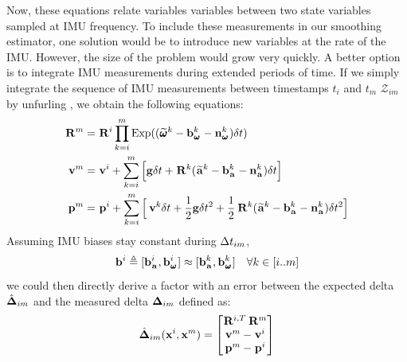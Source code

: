 Now, these equations relate variables variables between two state variables sampled at IMU frequency. To include these measurements in our smoothing estimator,
one solution would be to introduce new variables at the rate of the IMU. However, the size of the problem would grow very quickly. A better option
is to integrate IMU measurements during extended periods of time. If we simply integrate the sequence of IMU measurements between timestamps 
$t_i$ and $t_m$ $\mathcal{Z}_{im}$ by unfurling , we obtain the following equations:
%
\begin{equation}
    \begin{split}
    \prescript{}{}{{\bf R}}_{}^{m}  &= \prescript{}{}{{\bf R}}_{}^{i} \prod_{k=i}^{m} \operatorname*{Exp}((\prescript{}{}{\widetilde{\pmb{\omega}}}_{}^k - {\bf b}_{\prescript{}{}{\pmb{\omega}}_{}}^k - {\bf n}_{\prescript{}{}{\pmb{\omega}}_{}}^k)\delta t) \\
    \prescript{}{}{{\bf v}}_{}^{m}  &= \prescript{}{}{{\bf v}}_{}^{i} + \sum_{k=i}^{m} \Big[{\bf g} \delta t + \prescript{}{}{{\bf R}}_{}^{k}(\prescript{}{}{\widetilde{{\bf a}}}_{}^k - {\bf b}_{\prescript{}{}{{\bf a}}_{}}^k - {\bf n}_{\prescript{}{}{{\bf a}}_{}}^k)\delta t \Big]  \\
    \prescript{}{}{{\bf p}}_{}^{m} &= \prescript{}{}{{\bf p}}_{}^{i} + \sum_{k=i}^{m} \Big[\prescript{}{}{{\bf v}}_{}^{k}\delta t + \frac{1}{2}{\bf g} \delta t^2 
    + \frac{1}{2}\prescript{}{}{{\bf R}}_{}^{k}(\prescript{}{}{\widetilde{{\bf a}}}_{}^k - {\bf b}_{\prescript{}{}{{\bf a}}_{}}^k - {\bf n}_{\prescript{}{}{{\bf a}}_{}}^k)\delta t^2 \Big]
    \end{split}
    \label{eq:IMUIntij}
\end{equation}
%
Assuming IMU biases stay constant during $\Delta t_{im}$, 
\begin{equation*}
    {\bf b}^i \triangleq [{\bf b}_{\prescript{}{}{{\bf a}}_{}}^i, {\bf b}_{\prescript{}{}{\pmb{\omega}}_{}}^i] \approx [{\bf b}_{\prescript{}{}{{\bf a}}_{}}^k, {\bf b}_{\prescript{}{}{\pmb{\omega}}_{}}^k]  ~~~ \forall k \in [i..m]
\end{equation*}
%
we could then directly derive a factor with an error between the expected delta $\hat{{\bm \Delta}}_{im}$ and the measured delta ${\bm \Delta}_{im}$ defined as:
%
\begin{align}
    \hat{{\bm \Delta}}_{im}({\bf x}^i, {\bf x}^m) = 
    \begin{bmatrix}
    \prescript{}{}{{\bf R}}_{}^{i,T} \prescript{}{}{{\bf R}}_{}^{m}  \\
    \prescript{}{}{{\bf v}}_{}^{m}  - \prescript{}{}{{\bf v}}_{}^{i}  \\
    \prescript{}{}{{\bf p}}_{}^{m} - \prescript{}{}{{\bf p}}_{}^{i}
    \end{bmatrix}
\end{align}
